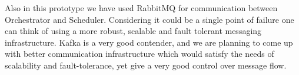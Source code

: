 \documentclass[review]{elsarticle}
\begin{document}
Also in this prototype we have used RabbitMQ for communication between Orchestrator and Scheduler. Considering it could be a single point of failure one can think of using a more robust, scalable and fault tolerant messaging infrastructure. Kafka is a very good contender, and we are planning to come up with better communication infrastructure which would satisfy the needs of scalability and fault-tolerance, yet give a very good control over message flow.


\end{document}
